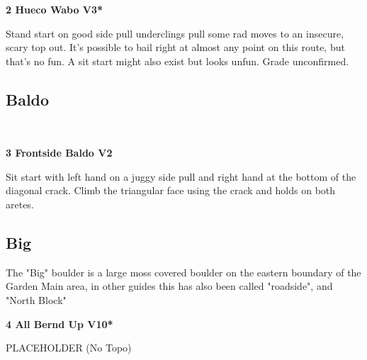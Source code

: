 \begin{multicols}{2}

					\begin{minipage}{\linewidth}	
					\label{rt:Hueco Wabo}
\colorbox{green!20}{
\textbf{
2 Hueco Wabo V3*  
}
}

					\begin{adjustwidth}{0.5cm}{}				
					Stand start on good side pull underclings pull some rad moves to an insecure, scary top out. It's possible to bail right at almost any point on this route, but that's no fun. A sit start might also exist but looks unfun. Grade unconfirmed.
					\end{adjustwidth}
					\end{minipage}
			\subsection*{Baldo}\label{bf:Baldo}
			\begin{minipage}{\columnwidth}
			\
			\end{minipage}
			

					\begin{minipage}{\linewidth}	
					\label{rt:Frontside Baldo}
\colorbox{green!20}{
\textbf{
3 Frontside Baldo V2    
}
}

					\begin{adjustwidth}{0.5cm}{}				
					Sit start with left hand on a juggy side pull and right hand at the bottom of the diagonal crack. Climb the triangular face using the crack and holds on both aretes.
					\end{adjustwidth}
					\end{minipage}
			\subsection*{Big}\label{bf:Big}
			\begin{minipage}{\columnwidth}
			The "Big" boulder is a large moss covered boulder on the eastern boundary of the Garden Main area, in other guides this has also been called "roadside", and "North Block"
			\end{minipage}
			
					\begin{minipage}{\linewidth}	
					\label{rt:All Bernd Up}
\colorbox{red!20}{
\textbf{
4 All Bernd Up V10*  
}
}

					\begin{adjustwidth}{0.5cm}{}				
					PLACEHOLDER
						\newline (No Topo) 
					\end{adjustwidth}
					\end{minipage}

\end{multicols}
